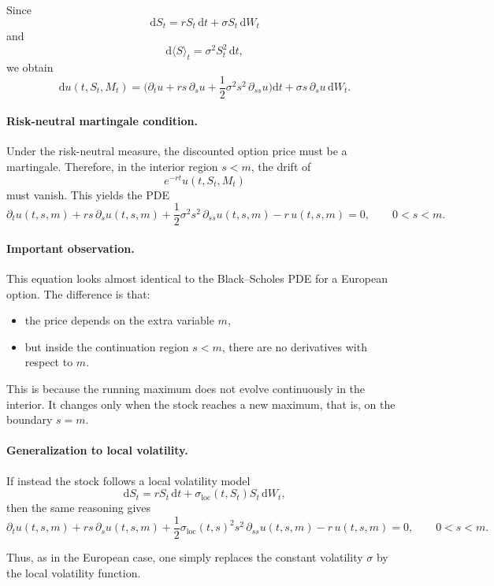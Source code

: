 \documentclass[11pt]{article}
\theoremstyle{plain}
\theoremstyle{definition}
\theoremstyle{remark}
\begin{document}
Since
\[
\mathrm{d}S_t=rS_t\,\mathrm{d}t+\sigma S_t\,\mathrm{d}W_t
\]
and
\[
\mathrm{d}\langle S\rangle_t=\sigma^2S_t^2\,\mathrm{d}t,
\]
we obtain
\[
\mathrm{d}u(t,S_t,M_t)
=
\Big(
\partial_t u
+
rs\,\partial_s u
+
\frac12 \sigma^2 s^2\,\partial_{ss}u
\Big)\mathrm{d}t
+
\sigma s\,\partial_s u\,\mathrm{d}W_t.
\]

\paragraph{Risk-neutral martingale condition.}
Under the risk-neutral measure, the discounted option price must be a
martingale.
Therefore, in the interior region \(s<m\), the drift of
\[
e^{-rt}u(t,S_t,M_t)
\]
must vanish.
This yields the PDE
\[
\boxed{
\partial_t u(t,s,m)
+
rs\,\partial_s u(t,s,m)
+
\frac12 \sigma^2 s^2\,\partial_{ss}u(t,s,m)
-r\,u(t,s,m)
=
0,
\qquad 0<s<m.
}
\]

\paragraph{Important observation.}
This equation looks almost identical to the Black--Scholes PDE for a
European option.
The difference is that:
\begin{itemize}[leftmargin=1.4em]
    \item the price depends on the extra variable \(m\),
    \item but inside the continuation region \(s<m\), there are no
    derivatives with respect to \(m\).
\end{itemize}

This is because the running maximum does not evolve continuously in the
interior.
It changes only when the stock reaches a new maximum, that is, on the
boundary \(s=m\).

\paragraph{Generalization to local volatility.}
If instead the stock follows a local volatility model
\[
\mathrm{d}S_t
=
rS_t\,\mathrm{d}t
+
\sigma_{\mathrm{loc}}(t,S_t)S_t\,\mathrm{d}W_t,
\]
then the same reasoning gives
\[
\boxed{
\partial_t u(t,s,m)
+
rs\,\partial_s u(t,s,m)
+
\frac12 \sigma_{\mathrm{loc}}(t,s)^2 s^2\,\partial_{ss}u(t,s,m)
-r\,u(t,s,m)
=
0,
\qquad 0<s<m.
}
\]

Thus, as in the European case, one simply replaces the constant
volatility \(\sigma\) by the local volatility function.
\end{document}
